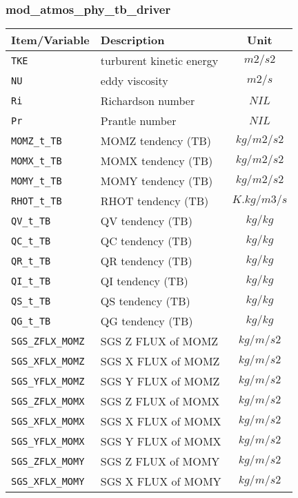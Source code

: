 \subsubsection{mod\_atmos\_phy\_tb\_driver}
 \begin{tabularx}{150mm}{|l|X|c|} \hline
 \rowcolor[gray]{0.9} Item/Variable & Description  & Unit \\ \hline
  \verb|TKE| & turburent kinetic energy & $m2/s2$ \\\hline
  \verb|NU|  & eddy viscosity           & $m2/s$ \\\hline
  \verb|Ri|  & Richardson number        & $NIL$  \\\hline
  \verb|Pr|  & Prantle number           & $NIL$  \\\hline
  \verb|MOMZ_t_TB| & MOMZ tendency (TB) & $kg/m2/s2$  \\\hline
  \verb|MOMX_t_TB| & MOMX tendency (TB) & $kg/m2/s2$  \\\hline
  \verb|MOMY_t_TB| & MOMY tendency (TB) & $kg/m2/s2$  \\\hline
  \verb|RHOT_t_TB| & RHOT tendency (TB) & $K.kg/m3/s$ \\\hline
  \verb|QV_t_TB|   & QV   tendency (TB) & $kg/kg$     \\\hline
  \verb|QC_t_TB|   & QC   tendency (TB) & $kg/kg$     \\\hline
  \verb|QR_t_TB|   & QR   tendency (TB) & $kg/kg$     \\\hline
  \verb|QI_t_TB|   & QI   tendency (TB) & $kg/kg$     \\\hline
  \verb|QS_t_TB|   & QS   tendency (TB) & $kg/kg$     \\\hline
  \verb|QG_t_TB|   & QG   tendency (TB) & $kg/kg$     \\\hline
  \verb|SGS_ZFLX_MOMZ| & SGS Z FLUX of MOMZ & $kg/m/s2$ \\\hline
  \verb|SGS_XFLX_MOMZ| & SGS X FLUX of MOMZ & $kg/m/s2$ \\\hline
  \verb|SGS_YFLX_MOMZ| & SGS Y FLUX of MOMZ & $kg/m/s2$ \\\hline
  \verb|SGS_ZFLX_MOMX| & SGS Z FLUX of MOMX & $kg/m/s2$ \\\hline
  \verb|SGS_XFLX_MOMX| & SGS X FLUX of MOMX & $kg/m/s2$ \\\hline
  \verb|SGS_YFLX_MOMX| & SGS Y FLUX of MOMX & $kg/m/s2$ \\\hline
  \verb|SGS_ZFLX_MOMY| & SGS Z FLUX of MOMY & $kg/m/s2$ \\\hline
  \verb|SGS_XFLX_MOMY| & SGS X FLUX of MOMY & $kg/m/s2$ \\\hline

\end{tabularx}
